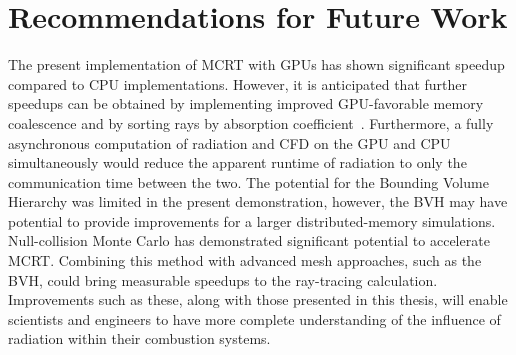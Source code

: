 \section{Recommendations for Future Work}
The present implementation of MCRT with GPUs has shown significant speedup compared to CPU implementations. However, it is anticipated that further speedups can be obtained by implementing improved GPU-favorable memory coalescence and by sorting rays by absorption coefficient~\cite{Silvestri2019ASimulation}.
Furthermore, a fully asynchronous computation of radiation and CFD on the GPU and CPU simultaneously would reduce the apparent runtime of radiation to only the communication time between the two. The potential for the Bounding Volume Hierarchy was limited in the present demonstration, however, the BVH may have potential to provide improvements for a larger distributed-memory simulations.
Null-collision Monte Carlo has demonstrated significant potential to accelerate MCRT. Combining this method with advanced mesh approaches, such as the BVH, could bring measurable speedups to the ray-tracing calculation.
Improvements such as these, along with those presented in this thesis, will enable scientists and engineers to have more complete understanding of the influence of radiation within their combustion systems. 
